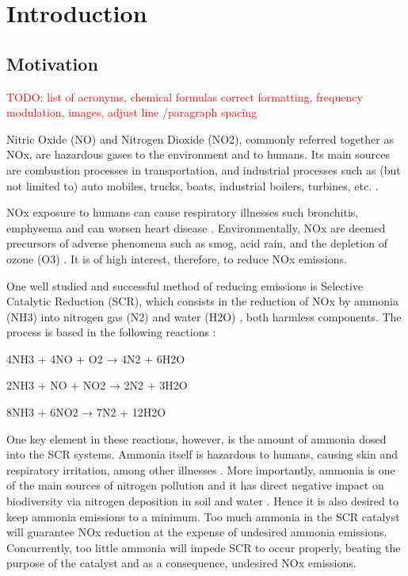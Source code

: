\chapter{Introduction}
\label{cha:introduction}

\section{Motivation}
\label{sec:motivation}

\textcolor{red}{TODO: list of acronyms, chemical formulas correct formatting, frequency modulation, images, adjust line /paragraph spacing}

Nitric Oxide (NO) and Nitrogen Dioxide (NO2), commonly referred together as NOx,  are hazardous gases to the environment and to humans. Its main sources are combustion processes in transportation, and industrial processes such as (but not limited to) auto mobiles, trucks, boats, industrial boilers, turbines, etc. \cite{EPA_2019}.

NOx exposure to humans can cause respiratory illnesses such bronchitis, emphysema and can worsen heart disease \cite{Boningari_2016}. Environmentally, NOx are deemed precursors of adverse phenomena such as smog, acid rain, and the depletion of ozone (O3) \cite{Bernabeo_2019}. It is of high interest, therefore, to reduce NOx emissions.

One well studied and successful method of reducing emissions is Selective Catalytic Reduction (SCR), which consists in the reduction of NOx by ammonia (NH3) into nitrogen gas (N2) and water (H2O) \cite{Forzatti_2001}, both harmless components. The process is based in the following reactions \cite{Forzatti_2001}:

4NH3 + 4NO + O2 → 4N2 + 6H2O

2NH3 + NO + NO2 → 2N2 + 3H2O

8NH3 + 6NO2 → 7N2 + 12H2O

One key element in these reactions, however, is the amount of ammonia dosed into the SCR systems. Ammonia itself is hazardous to humans, causing skin and respiratory irritation, among other illnesses \cite{ASTDRA_2004}. More importantly, ammonia is one of the main sources of nitrogen pollution and it has direct negative impact on biodiversity via nitrogen deposition in soil and water \cite{RAND_2018}. Hence it is also desired to keep ammonia emissions to a minimum. Too much ammonia in the SCR catalyst will guarantee NOx reduction at the expense of undesired ammonia emissions. Concurrently, too little ammonia will impede SCR to occur properly, beating the purpose of the catalyst and as a consequence, undesired NOx emissions.

